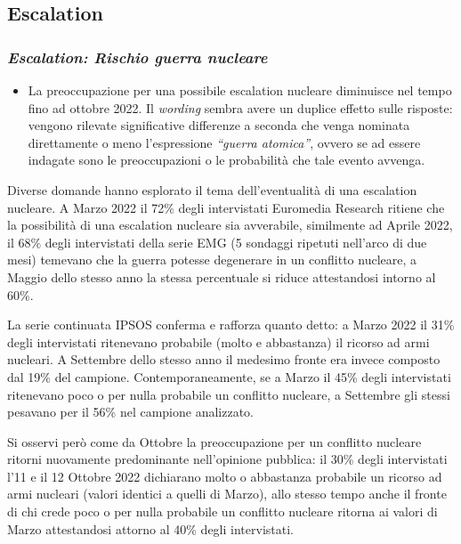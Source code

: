 \documentclass[
  openany]{book}
\providecommand{\tightlist}{%
  \setlength{\itemsep}{0pt}\setlength{\parskip}{0pt}}
\begin{document}
\hypertarget{escalation}{%
\subsection{Escalation}\label{escalation}}

\hypertarget{escalation-rischio-guerra-nucleare}{%
\subsubsection{\texorpdfstring{\emph{Escalation: Rischio guerra nucleare}}{Escalation: Rischio guerra nucleare}}\label{escalation-rischio-guerra-nucleare}}

\begin{itemize}
\tightlist
\item
  La preoccupazione per una possibile escalation nucleare diminuisce nel tempo fino ad ottobre 2022. Il \emph{wording} sembra avere un duplice effetto sulle risposte: vengono rilevate significative differenze a seconda che venga nominata direttamente o meno l'espressione \emph{``guerra atomica''}, ovvero se ad essere indagate sono le preoccupazioni o le probabilità che tale evento avvenga.
\end{itemize}

Diverse domande hanno esplorato il tema dell'eventualità di una escalation nucleare. A Marzo 2022 il 72\% degli intervistati Euromedia Research ritiene che la possibilità di una escalation nucleare sia avverabile, similmente ad Aprile 2022, il 68\% degli intervistati della serie EMG (5 sondaggi ripetuti nell'arco di due mesi) temevano che la guerra potesse degenerare in un conflitto nucleare, a Maggio dello stesso anno la stessa percentuale si riduce attestandosi intorno al 60\%.

La serie continuata IPSOS conferma e rafforza quanto detto: a Marzo 2022 il 31\% degli intervistati ritenevano probabile (molto e abbastanza) il ricorso ad armi nucleari. A Settembre dello stesso anno il medesimo fronte era invece composto dal 19\% del campione. Contemporaneamente, se a Marzo il 45\% degli intervistati ritenevano poco o per nulla probabile un conflitto nucleare, a Settembre gli stessi pesavano per il 56\% nel campione analizzato.

Si osservi però come da Ottobre la preoccupazione per un conflitto nucleare ritorni nuovamente predominante nell'opinione pubblica: il 30\% degli intervistati l'11 e il 12 Ottobre 2022 dichiarano molto o abbastanza probabile un ricorso ad armi nucleari (valori identici a quelli di Marzo), allo stesso tempo anche il fronte di chi crede poco o per nulla probabile un conflitto nucleare ritorna ai valori di Marzo attestandosi attorno al 40\% degli intervistati.
\end{document}
